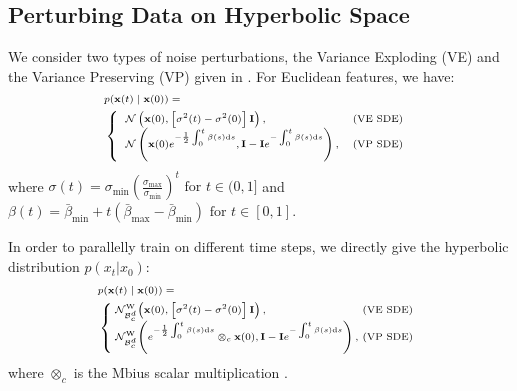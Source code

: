 \documentclass[letterpaper]{article} %
\begin{document}
\subsection{Perturbing Data on Hyperbolic Space}
We consider two types of noise perturbations, the Variance Exploding (VE) and the Variance Preserving (VP) given in \cite{song2020score}. For Euclidean features, we have:
\begin{equation}\label{9}
\begin{scriptsize}{
\begin{aligned}
&p(\mathbf{x}(t) \mid \mathbf{x}(0))=\\ &\left\{\begin{array}{ll}
\mathcal{N}\left(\mathbf{x}(0),\left[\sigma^{2}(t)-\sigma^{2}(0)\right] \mathbf{I}\right), & \text {(VE SDE) } \\
\mathcal{N}\left(\mathbf{x}(0)e^{-\frac{1}{2} \int_{0}^{t} \beta(s) \mathrm{d} s} , \mathbf{I}-\mathbf{I} e^{-\int_{0}^{t} \beta(s) \mathrm{d} s}\right), & (\text{VP SDE)} \\
\end{array}\right.
\end{aligned}
}\end{scriptsize}
\end{equation}
where $\sigma(t)=\sigma_{\min }\left(\frac{\sigma_{\max }}{\sigma_{\min }}\right)^{t} \text { for } t \in(0,1]$ and $\beta(t)=\bar{\beta}_{\min }+t\left(\bar{\beta}_{\max }-\bar{\beta}_{\min }\right) \text { for } t \in[0,1]$.

In order to parallelly train on different time steps, we directly give the hyperbolic distribution $p (x_t | x_0)$:
\begin{equation}\label{10}
\begin{scriptsize}{
\begin{aligned}
    &p(\mathbf{x}(t) \mid \mathbf{x}(0))=\\ &\left\{\hspace{-0.1cm}\begin{array}{ll}
\mathcal{N}_{\mathcal{B}_{c}^{d}}^{\mathrm{W}}\!\left(\mathbf{x}(0),\left[\sigma^{2}(t)-\sigma^{2}(0)\right] \mathbf{I}\right), &\hspace{-0.25cm} \text{(VE SDE)} \\
\mathcal{N}_{\mathcal{B}_{c}^{d}}^{\mathrm{W}}\!\left(e^{-\frac{1}{2} \int_{0}^{t} \beta(s) \mathrm{d} s}\otimes_c \mathbf{x}(0) , \mathbf{I}-\mathbf{I} e^{-\int_{0}^{t} \beta(s) \mathrm{d} s}\right), &\hspace{-0.25cm} (\text{VP SDE)} \\
\end{array}\right.
\end{aligned}
}\end{scriptsize}
\end{equation}
where $\otimes_c$ is the Mbius scalar multiplication \cite{ungar2007hyperbolic}.
\end{document}
